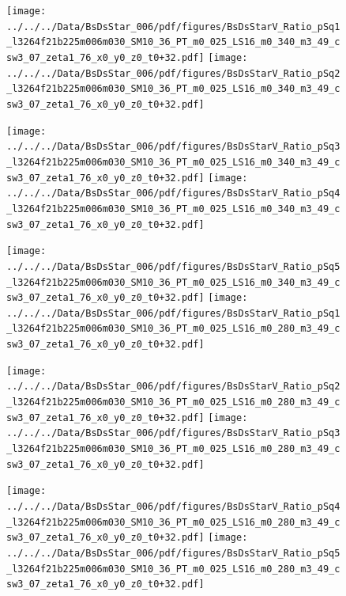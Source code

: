 \documentclass[a4paper,10pt]{article}
\begin{document}
\begin{figure}[p]
 \texttt{[image: ../../../Data/BsDsStar\_006/pdf/figures/BsDsStarV\_Ratio\_pSq1\_l3264f21b225m006m030\_SM10\_36\_PT\_m0\_025\_LS16\_m0\_340\_m3\_49\_csw3\_07\_zeta1\_76\_x0\_y0\_z0\_t0+32.pdf]} 
 \texttt{[image: ../../../Data/BsDsStar\_006/pdf/figures/BsDsStarV\_Ratio\_pSq2\_l3264f21b225m006m030\_SM10\_36\_PT\_m0\_025\_LS16\_m0\_340\_m3\_49\_csw3\_07\_zeta1\_76\_x0\_y0\_z0\_t0+32.pdf]} 
 \end{figure}
\begin{figure}[p]
 \texttt{[image: ../../../Data/BsDsStar\_006/pdf/figures/BsDsStarV\_Ratio\_pSq3\_l3264f21b225m006m030\_SM10\_36\_PT\_m0\_025\_LS16\_m0\_340\_m3\_49\_csw3\_07\_zeta1\_76\_x0\_y0\_z0\_t0+32.pdf]} 
 \texttt{[image: ../../../Data/BsDsStar\_006/pdf/figures/BsDsStarV\_Ratio\_pSq4\_l3264f21b225m006m030\_SM10\_36\_PT\_m0\_025\_LS16\_m0\_340\_m3\_49\_csw3\_07\_zeta1\_76\_x0\_y0\_z0\_t0+32.pdf]} 
 \end{figure}
\begin{figure}[p]
 \texttt{[image: ../../../Data/BsDsStar\_006/pdf/figures/BsDsStarV\_Ratio\_pSq5\_l3264f21b225m006m030\_SM10\_36\_PT\_m0\_025\_LS16\_m0\_340\_m3\_49\_csw3\_07\_zeta1\_76\_x0\_y0\_z0\_t0+32.pdf]} 
 \texttt{[image: ../../../Data/BsDsStar\_006/pdf/figures/BsDsStarV\_Ratio\_pSq1\_l3264f21b225m006m030\_SM10\_36\_PT\_m0\_025\_LS16\_m0\_280\_m3\_49\_csw3\_07\_zeta1\_76\_x0\_y0\_z0\_t0+32.pdf]} 
 \end{figure}
\clearpage
\begin{figure}[p]
 \texttt{[image: ../../../Data/BsDsStar\_006/pdf/figures/BsDsStarV\_Ratio\_pSq2\_l3264f21b225m006m030\_SM10\_36\_PT\_m0\_025\_LS16\_m0\_280\_m3\_49\_csw3\_07\_zeta1\_76\_x0\_y0\_z0\_t0+32.pdf]} 
 \texttt{[image: ../../../Data/BsDsStar\_006/pdf/figures/BsDsStarV\_Ratio\_pSq3\_l3264f21b225m006m030\_SM10\_36\_PT\_m0\_025\_LS16\_m0\_280\_m3\_49\_csw3\_07\_zeta1\_76\_x0\_y0\_z0\_t0+32.pdf]} 
 \end{figure}
\begin{figure}[p]
 \texttt{[image: ../../../Data/BsDsStar\_006/pdf/figures/BsDsStarV\_Ratio\_pSq4\_l3264f21b225m006m030\_SM10\_36\_PT\_m0\_025\_LS16\_m0\_280\_m3\_49\_csw3\_07\_zeta1\_76\_x0\_y0\_z0\_t0+32.pdf]} 
 \texttt{[image: ../../../Data/BsDsStar\_006/pdf/figures/BsDsStarV\_Ratio\_pSq5\_l3264f21b225m006m030\_SM10\_36\_PT\_m0\_025\_LS16\_m0\_280\_m3\_49\_csw3\_07\_zeta1\_76\_x0\_y0\_z0\_t0+32.pdf]} 
 \end{figure}
\clearpage
\end{document}
